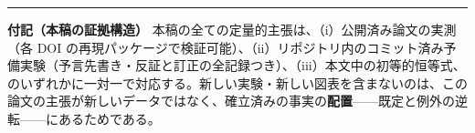\documentclass[
  a4paper,
]{ltjsarticle}
\begin{document}
\begin{center}\rule{0.5\linewidth}{0.5pt}\end{center}

\textbf{付記（本稿の証拠構造）}
本稿の全ての定量的主張は、（i）公開済み論文の実測（各 DOI
の再現パッケージで検証可能）、（ii）リポジトリ内のコミット済み予備実験（予言先書き・反証と訂正の全記録つき）、（iii）本文中の初等的恒等式、のいずれかに一対一で対応する。新しい実験・新しい図表を含まないのは、この論文の主張が新しいデータではなく、確立済みの事実の\textbf{配置}------既定と例外の逆転------にあるためである。
\end{document}
